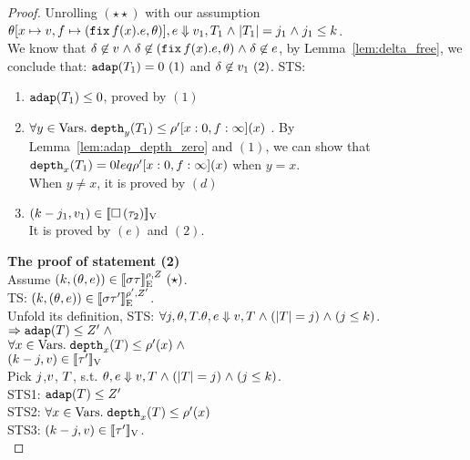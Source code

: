 \begin{proof}
Unrolling $(\star\star)$ with our assumption $ \theta[x \mapsto v, f \mapsto (\mathop{\mathtt{fix}} f(x).e,
\theta)], e \mathrel{\Downarrow} v_1, T_1 \mathrel{\wedge} |T_1| = j_1 \mathrel{\wedge}
j_1 \leq k $. \\ 
We know that $\delta \not\in v \mathrel{\wedge} \delta \not\in  (\mathop{\mathtt{fix}} f(x).e,
\theta) \mathrel{\wedge} \delta \not\in e $, by Lemma~\ref{lem:delta_free}, we
conclude that: $\mathtt{adap}(T_1) =0~(1)$ and  $ \delta \not \in v_1~(2)$.
 STS:
\begin{enumerate}
\item $ \mathtt{adap}(T_1) \leq 0 $, proved by $(1)$ \\  

\item $\forall y \in \mbox{Vars}.\;  \mathtt{depth}_{y}(T_1) \leq
         \rho'[x: 0, f: \infty](x)$ . By
         Lemma~\ref{lem:adap_depth_zero} and $(1)$, we can show that
         $\mathtt{depth}_{x}(T_1) = 0 
leq \rho'[x: 0, f: \infty](x) $ when $y = x$.\\
           When $y \not= x$, it is proved by $(d)$    \\

\item $  (k - j_1,  v_1) \in [\![ \mathtt{\square} \, (\tau_2)  ]\!]_{\text{V}}$
  \\
It is proved by $(e)$ and $(2)$.
\end{enumerate}
  

\textbf{The proof of statement (2)} \\
Assume $(k, (\theta, e)) \in
 [\![ \sigma \tau ]\!]_{\text{E}}^{\rho, Z}~(\star)$. \\
%


TS: $(k, (\theta, e)) \in
 [\![ \sigma \tau' ]\!]_{\text{E}}^{\rho', Z'}$.\\
Unfold its definition, STS:
$ \forall j, \theta, T.  \theta, e \mathrel{\Downarrow} v, T \mathrel{\wedge}
(|T| = j) \mathrel{\wedge} (j \leq k) $.\\
$\Rightarrow \mathtt{adap}(T) \leq Z' \mathrel{\wedge}$\\
$\forall x \in \mbox{Vars}.\;  \mathtt{depth}_{x}(T) \leq \rho'(x)\mathrel{\wedge}$\\
$ (k - j,  v) \in [\![ \tau' ]\!]_{\text{V}}$\\
%
Pick  $j$,$v$,  $T$, s.t.
$\theta, e \mathrel{\Downarrow} v, T \mathrel{\wedge}
(|T| = j) \mathrel{\wedge} (j \leq k) $.\\
STS1: $\mathtt{adap}(T) \leq Z' $ \\
STS2: $\forall x \in \mbox{Vars}.\;  \mathtt{depth}_{x}(T) \leq
\rho'(x)$\\
STS3: $ (k - j,  v) \in [\![ \tau' ]\!]_{\text{V}}  $.\\



\end{proof}
